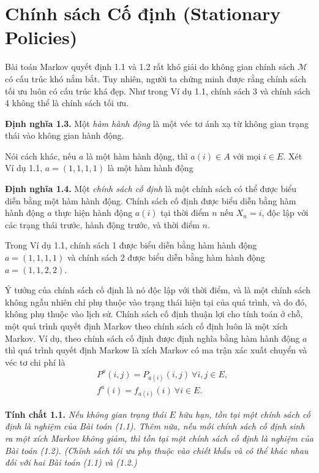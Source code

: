 \documentclass[12pt,a4paper]{report}
\begin{document}
    \section{Chính sách Cố định (Stationary Policies)}
    Bài toán Markov quyết định 1.1 và 1.2 rất khó giải do không gian chính sách $\mathcal{M}$ có cấu trúc khó nắm bắt. Tuy nhiên, người ta chứng minh được rằng chính sách tối ưu luôn có cấu trúc khá đẹp. Như trong Ví dụ 1.1, chính sách 3 và chính sách 4 không thể là chính sách tối ưu.
    
    \medskip
    \noindent
    \textbf{Định nghĩa 1.3.} Một \textit{hàm hành động} là một véc tơ ánh xạ từ không gian trạng thái vào không gian hành động.
    
    \medskip
    Nói cách khác, nếu $a$ là một hàm hành động, thì $a(i) \in A$ với mọi $i\in E$. Xét Ví dụ 1.1, $a=(1,1,1,1)$ là một hàm hành động
    
     
    \medskip
    \noindent
    \textbf{Định nghĩa 1.4.} Một \textit{chính sách cố định} là một chính sách có thể được biểu diễn bằng một hàm hành động. Chính sách cố định được biểu diễn bằng hàm hành động $a$ thực hiện hành động $a(i)$ tại thời điểm $n$ nếu $X_n=i$, độc lập với các trạng thái trước, hành động trước, và thời điểm $n$. 
   
     
    \medskip
    Trong Ví dụ 1.1, chính sách 1 được biểu diễn bằng hàm hành động $a=(1,1,1,1)$ và chính sách 2 được biểu diễn bằng hàm hành động $a=(1,1,2,2)$.
    
    \medskip
    Ý tưởng của chính sách cố định là nó độc lập với thời điểm, và là một chính sách không ngẫu nhiên chỉ phụ thuộc vào trạng thái hiện tại của quá trình, và do đó, không phụ thuộc vào lịch sử. Chính sách cố định thuận lợi cho tính toán ở chỗ, một quá trình quyết định Markov theo chính sách cố định luôn là một xích Markov. Ví dụ, theo chính sách cố định được định nghĩa bằng hàm hành động $a$ thì quá trình quyết định Markow là xích Markov có ma trận xác xuất chuyển và véc tơ chi phí là
    \begin{align}
    &P^a(i,j)=P_{a(i)}(i,j) \ \forall i,j \in E,\\
    &f^a(i)=f_{a(i)}(i) \  \forall i\in E.
    \end{align} 
    
  
   \begin{shaded*}
   	\noindent
     \textbf{Tính chất 1.1.} \textit{ Nếu không gian trạng thái $E$ hữu hạn, tồn tại một chính sách cố định là nghiệm của Bài toán (1.1). Thêm nữa, nếu mỗi chính sách cố định sinh ra một xích Markov không giảm, thì tồn tại một chính sách cố định là nghiệm của Bài toán (1.2). (Chính sách tối ưu phụ thuộc vào chiết khấu và có thể khác nhau đối với hai Bài toán (1.1) và (1.2.) }
   \end{shaded*}
   
\end{document}
